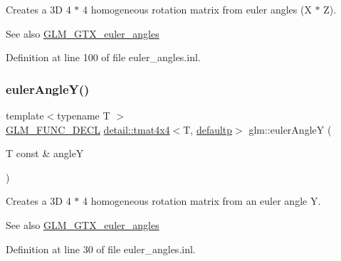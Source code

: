 Creates a 3D 4 $\ast$ 4 homogeneous rotation matrix from euler angles (X $\ast$ Z). \begin{DoxySeeAlso}{See also}
\hyperlink{group__gtx__euler__angles}{G\+L\+M\+\_\+\+G\+T\+X\+\_\+euler\+\_\+angles} 
\end{DoxySeeAlso}


Definition at line 100 of file euler\+\_\+angles.\+inl.

\mbox{\label{group__gtx__euler__angles_gacdc188a23a928d57d4490ff7d646fb96}} 
\subsubsection{\texorpdfstring{euler\+Angle\+Y()}{eulerAngleY()}}
{\footnotesize\ttfamily template$<$typename T $>$ \\
\hyperlink{setup_8hpp_ab2d052de21a70539923e9bcbf6e83a51}{G\+L\+M\+\_\+\+F\+U\+N\+C\+\_\+\+D\+E\+CL} \hyperlink{structglm_1_1detail_1_1tmat4x4}{detail\+::tmat4x4}$<$T, \hyperlink{namespaceglm_a0f04f086094c747d227af4425893f545a9d21ccd8b5a009ec7eb7677befc3bf51}{defaultp}$>$ glm\+::euler\+AngleY (\begin{DoxyParamCaption}\item[{T const \&}]{angleY }\end{DoxyParamCaption})}

Creates a 3D 4 $\ast$ 4 homogeneous rotation matrix from an euler angle Y. \begin{DoxySeeAlso}{See also}
\hyperlink{group__gtx__euler__angles}{G\+L\+M\+\_\+\+G\+T\+X\+\_\+euler\+\_\+angles} 
\end{DoxySeeAlso}


Definition at line 30 of file euler\+\_\+angles.\+inl.

\mbox{\label{group__gtx__euler__angles_ga7599a8aaf3bf33b15517dd522a6d8020}} 

